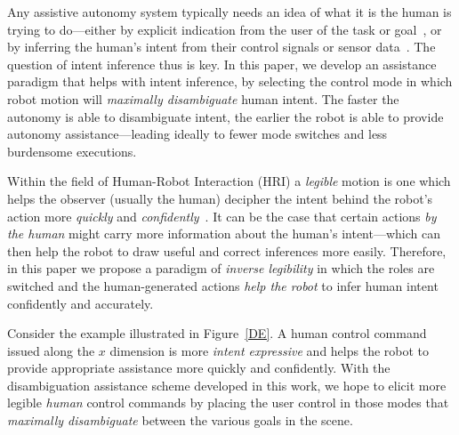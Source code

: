 \documentclass[conference]{IEEEtran}
\begin{document}
 Any assistive autonomy system typically needs an idea of what it is the human is trying to do---either by explicit indication from the user of the task or goal~\cite{choi2008laser}, or by inferring the human's intent from their control signals or sensor data~\cite{tavakkoli2007vision,wasson2003user}. The question of intent inference thus is key. In this paper, we develop an assistance paradigm that helps with intent inference, by selecting the control mode in which robot motion will \textit{maximally disambiguate} human intent. The faster the autonomy is able to disambiguate intent, the earlier the robot is able to provide autonomy assistance---leading ideally to fewer mode switches and less burdensome executions. 


Within the field of Human-Robot Interaction (HRI) a \textit{legible} motion is one which helps the observer (usually the human) decipher the intent behind the robot's action more \textit{quickly} and \textit{confidently}~\cite{dragan2013legibility}. It can be the case that certain actions \textit{by the human} might carry more information about the human's intent---which can then help the robot to draw useful and correct inferences more easily. Therefore, in this paper we propose a paradigm of \textit{inverse legibility} in which the roles are switched and the human-generated actions \textit{help the robot} to infer human intent confidently and accurately. 

Consider the example illustrated in Figure~\ref{DE}. A human control command issued along the $x$ dimension is more \textit{intent expressive} and helps the robot to provide appropriate assistance more quickly and confidently. With the disambiguation assistance scheme developed in this work, we hope to elicit more legible \textit{human} control commands by placing the user control in those modes that \textit{maximally disambiguate} between the various goals in the scene. 
\end{document}
